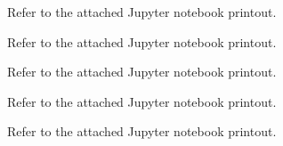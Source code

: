 \documentclass[12pt,twoside]{article}
\begin{document}
\begin{problems}
\begin{problemparts}
\problempart %

Refer to the attached Jupyter notebook printout.

\problempart %

Refer to the attached Jupyter notebook printout.

\problempart %

Refer to the attached Jupyter notebook printout.

\problempart %

Refer to the attached Jupyter notebook printout.

\problempart %

Refer to the attached Jupyter notebook printout.

\end{problemparts}

\end{problems}
\end{document}
